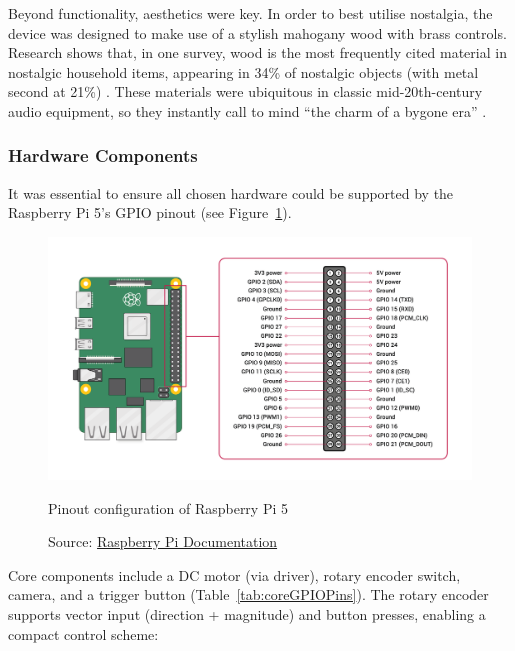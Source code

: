             Beyond functionality, aesthetics were key. In order to best utilise nostalgia, the device was designed to make use of a stylish mahogany wood with brass controls. Research shows that, in one survey, wood is the most frequently cited material in nostalgic household items, appearing in 34\% of nostalgic objects (with metal second at 21\%) \cite{Skinner2022}. These materials were ubiquitous in classic mid-20th-century audio equipment, so they instantly call to mind ``the charm of a bygone era'' \cite{LookInTheAttic2024}.
    
            \subsubsection{Hardware Components}
    
                It was essential to ensure all chosen hardware could be supported by the Raspberry Pi 5's GPIO pinout (see Figure~\ref{fig:RPi5Pinout}).
    
                \begin{figure}[htbp]
                    \centering
                    \includegraphics[width=\linewidth]{images/raspberry-pi-5-pinout.png}
                    \caption{Pinout configuration of Raspberry Pi 5}
                    \label{fig:RPi5Pinout}
                    \caption*{Source: \href{https://www.raspberrypi.com/documentation/computers/raspberry-pi.html#gpio}{Raspberry Pi Documentation}}
                \end{figure}
    
                Core components include a DC motor (via driver), rotary encoder switch, camera, and a trigger button (Table~\ref{tab:coreGPIOPins}). The rotary encoder supports vector input (direction + magnitude) and button presses, enabling a compact control scheme:
    
